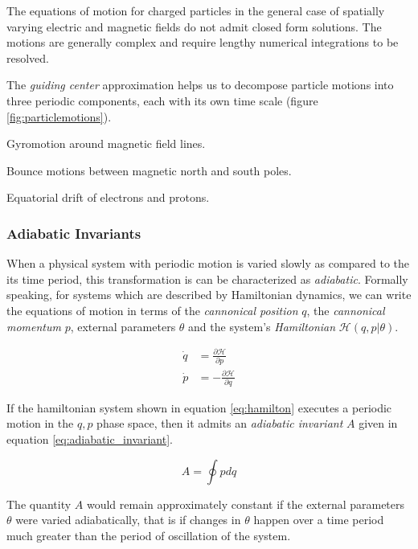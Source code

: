 The equations of motion for charged particles in the general case of spatially varying electric and magnetic fields 
do not admit closed form solutions. The motions are generally complex and require lengthy numerical integrations 
to be resolved.

The \emph{guiding center} approximation helps us to decompose particle motions into three periodic components, 
each with its own time scale (figure \ref{fig:particlemotions}).
\begin{enumerate*}
    \item Gyromotion around magnetic field lines.
    \item Bounce motions between magnetic north and south poles.
    \item Equatorial drift of electrons and protons.
\end{enumerate*}

\subsubsection*{Adiabatic Invariants}

When a physical system with periodic motion is varied slowly as compared to the its time period, this 
transformation is can be characterized as \emph{adiabatic}. Formally speaking, for systems which are described by Hamiltonian dynamics, we can write the equations of motion in terms of the \emph{cannonical position} $q$, 
the \emph{cannonical momentum} $p$, external parameters $\theta$ and the system's \emph{Hamiltonian} 
$\mathcal{H}(q,p|\theta)$. 

\begin{align}\label{eq:hamilton}
    \dot q &= \frac{\partial \mathcal{H}}{\partial p}\\
    \dot p &= - \frac{\partial \mathcal{H}}{\partial q}
\end{align}

If the hamiltonian system shown in equation \ref{eq:hamilton} executes a periodic motion in the $q,p$ phase space, 
then it admits an \emph{adiabatic invariant} $A$ given in equation \ref{eq:adiabatic_invariant}.

\begin{equation}\label{eq:adiabatic_invariant}
    A = \oint p dq
\end{equation}

The quantity $A$ would remain approximately constant if the external parameters $\theta$ were varied adiabatically, 
that is if changes in $\theta$ happen over a time period much greater than the period of oscillation of the system.

